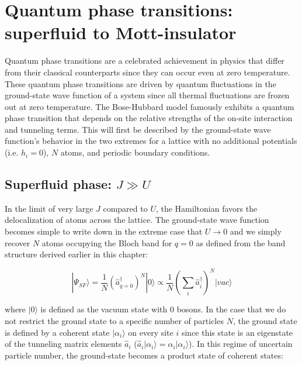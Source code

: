 

\section{Quantum phase transitions: superfluid to Mott-insulator}

Quantum phase transitions are a celebrated achievement in physics that differ from their classical counterparts since they can occur even at zero temperature. These quantum phase transitions are driven by quantum fluctuations in the ground-state wave function of a system since all thermal fluctuations are frozen out at zero temperature. The Bose-Hubbard model famously exhibits a quantum phase transition that depends on the relative strengths of the on-site interaction and tunneling terms. This will first be described by the ground-state wave function's behavior in the two extremes for a lattice with no additional potentials (i.e.  $h_i = 0$), $N$ atoms, and periodic boundary conditions.

\subsection{Superfluid phase: $J \gg U$}

In the limit of very large $J$ compared to $U$, the Hamiltonian favors the delocalization of atoms across the lattice. The ground-state wave function becomes simple to write down in the extreme case that $U\rightarrow0$ and we simply recover $N$ atoms occupying the Bloch band for $q=0$ as defined from the band structure derived earlier in this chapter: 

\begin{equation}
\label{eqn:SF}
| \Psi_{SF} \rangle = \frac{1}{N} \left ( \hat{a}^\dagger_{q=0} \right )^N |0\rangle \propto \frac{1}{N} \left (\sum_i \hat{a}^\dagger_i \right )^N |vac\rangle
\end{equation} 

where $|0\rangle$ is defined as the vacuum state with $0$ bosons. In the case that we do not restrict the ground state to a specific number of particles $N$, the ground state is defined by a coherent state $|\alpha_i\rangle$ on every site $i$ since this state is an eigenstate of the tunneling matrix elements $\hat{a}_i$ ($\hat{a}_i |\alpha_i\rangle = \alpha_i |\alpha_i \rangle$). In this regime of uncertain particle number, the ground-state becomes a product state of coherent states:

